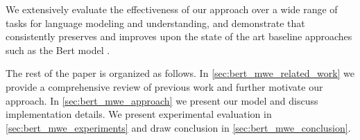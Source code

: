 We extensively evaluate the effectiveness of our approach over a wide range of tasks for language modeling and understanding, and demonstrate that \BertMWE consistently preserves and improves upon the state of the art baseline approaches such as the Bert model \cite{devlin2018bert}.


The rest of the paper is organized as follows. 
In \autoref{sec:bert_mwe_related_work} we provide a comprehensive review of previous work and further motivate our approach. 
In \autoref{sec:bert_mwe_approach} we present our \BertMWE model and discuss implementation details. 
We present experimental evaluation in  \autoref{sec:bert_mwe_experiments} and draw conclusion in  \autoref{sec:bert_mwe_conclusion}.
